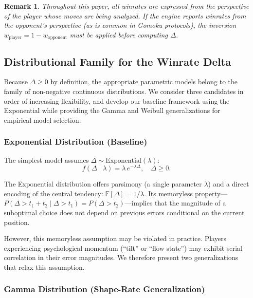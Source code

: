 \documentclass[11pt,a4paper]{article}
\newtheorem{remark}{Remark}
\newcommand{\E}{\mathbb{E}}
\begin{document}
\begin{remark}
Throughout this paper, all winrates are expressed from the perspective of the
player whose moves are being analyzed. If the engine reports winrates from the
opponent's perspective (as is common in Gomoku protocols), the inversion
$w_{\text{player}} = 1 - w_{\text{opponent}}$ must be applied before computing
$\Delta$.
\end{remark}

\subsection{Distributional Family for the Winrate Delta}
\label{sec:dist_family}

Because $\Delta \geq 0$ by definition, the appropriate parametric models
belong to the family of non-negative continuous distributions. We consider
three candidates in order of increasing flexibility, and develop our baseline
framework using the Exponential while providing the Gamma and Weibull
generalizations for empirical model selection.

\subsubsection{Exponential Distribution (Baseline)}

The simplest model assumes $\Delta \sim \text{Exponential}(\lambda)$:
\begin{equation}
    f(\Delta \mid \lambda) = \lambda \, e^{-\lambda \Delta}, \quad \Delta \geq 0.
    \label{eq:exponential_pdf}
\end{equation}

The Exponential distribution offers parsimony (a single parameter $\lambda$)
and a direct encoding of the central tendency: $\E[\Delta] = 1/\lambda$.
Its memoryless property---$P(\Delta > t_1 + t_2 \mid \Delta > t_1) =
P(\Delta > t_2)$---implies that the magnitude of a suboptimal choice does
not depend on previous errors conditional on the current position.

However, this memoryless assumption may be violated in practice.
Players experiencing psychological momentum (``tilt'' or ``flow state'') may
exhibit serial correlation in their error magnitudes. We therefore present
two generalizations that relax this assumption.

\subsubsection{Gamma Distribution (Shape-Rate Generalization)}
\end{document}
